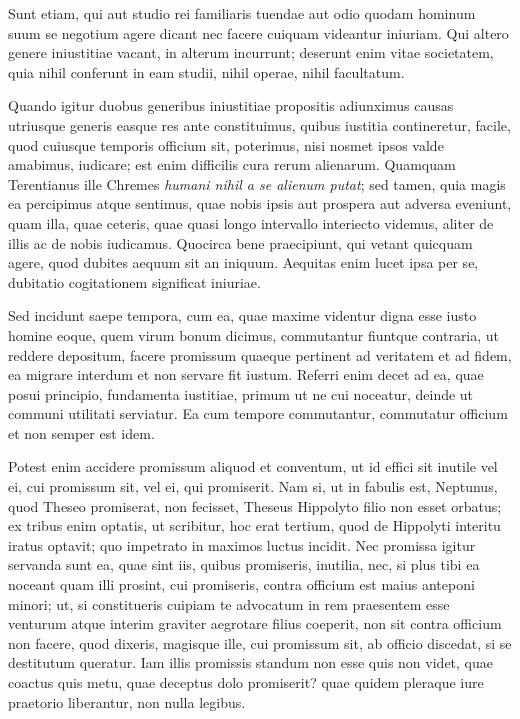  

 Sunt etiam, qui aut studio rei familiaris tuendae aut odio quodam hominum suum se negotium agere dicant nec facere cuiquam videantur iniuriam. Qui altero genere iniustitiae vacant, in alterum incurrunt; deserunt enim vitae societatem, quia nihil conferunt in eam studii, nihil operae, nihil facultatum.

Quando igitur duobus generibus iniustitiae propositis adiunximus causas utriusque generis easque res ante constituimus, quibus iustitia contineretur, facile, quod cuiusque temporis officium sit, poterimus, nisi nosmet ipsos valde amabimus, iudicare;  est enim difficilis cura rerum alienarum. Quamquam Terentianus ille Chremes \textit{humani nihil a se alienum putat}; sed tamen, quia magis ea percipimus atque sentimus, quae nobis ipsis aut prospera aut adversa eveniunt, quam illa, quae ceteris, quae quasi longo intervallo interiecto videmus, aliter de illis ac de nobis iudicamus. Quocirca bene praecipiunt, qui vetant quicquam agere, quod dubites aequum sit an iniquum. Aequitas enim lucet ipsa per se, dubitatio cogitationem significat iniuriae.

 

 Sed incidunt saepe tempora, cum ea, quae maxime videntur digna esse iusto homine eoque, quem virum bonum dicimus, commutantur fiuntque contraria, ut reddere depositum, facere promissum quaeque pertinent ad veritatem et ad fidem, ea migrare interdum et non servare fit iustum. Referri enim decet ad ea, quae posui principio, fundamenta iustitiae, primum ut ne cui noceatur, deinde ut communi utilitati serviatur. Ea cum tempore commutantur, commutatur officium et non semper est idem.


 Potest enim accidere promissum aliquod et conventum, ut id effici sit inutile vel ei, cui promissum sit, vel ei, qui promiserit. Nam si, ut in fabulis est, Neptunus, quod Theseo promiserat, non fecisset, Theseus Hippolyto filio non esset orbatus; ex tribus enim optatis, ut scribitur, hoc erat tertium, quod de Hippolyti interitu iratus optavit; quo impetrato in maximos luctus incidit. Nec promissa igitur servanda sunt ea, quae sint iis, quibus promiseris, inutilia, nec, si plus tibi ea noceant quam illi prosint, cui promiseris, contra officium est maius anteponi minori; ut, si constitueris cuipiam te advocatum in rem praesentem esse venturum atque interim graviter aegrotare filius coeperit, non sit contra officium non facere, quod dixeris, magisque ille, cui promissum sit, ab officio discedat, si se destitutum queratur. Iam illis promissis standum non esse quis non videt, quae coactus quis metu, quae deceptus dolo promiserit? quae quidem pleraque iure praetorio liberantur, non nulla legibus.

